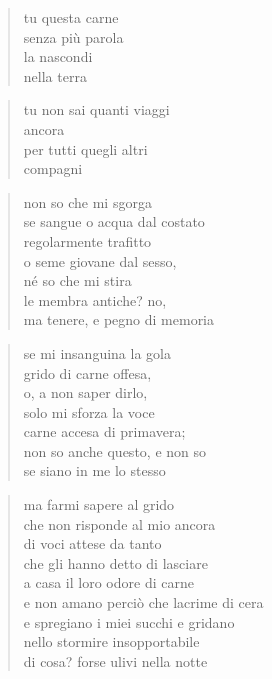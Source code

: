 	\begin{verse}
		tu questa carne\\
		senza più parola\\
		la nascondi\\
		nella terra
	\end{verse}

	\begin{verse}
		tu non sai quanti viaggi\\
		ancora\\
		per tutti quegli altri\\
		compagni
	\end{verse}

\clearpage


	\begin{verse}
		non so che mi sgorga\\
		se sangue o acqua dal costato\\
		regolarmente trafitto\\
		o seme giovane dal sesso,\\
		né so che mi stira\\
		le membra antiche? no,\\
		ma tenere, e pegno di memoria
	\end{verse}

	\begin{verse}
		se mi insanguina la gola\\
		grido di carne offesa,\\
		o, a non saper dirlo,\\
		solo mi sforza la voce\\
		carne accesa di primavera;\\
		non so anche questo, e non so\\
		se siano in me lo stesso
	\end{verse}

\clearpage


	\begin{verse}
		ma farmi sapere al grido\\
		che non risponde al mio ancora\\
		di voci attese da tanto\\
		che gli hanno detto di lasciare\\
		a casa il loro odore di carne\\
		e non amano perciò che lacrime di cera\\
		e spregiano i miei succhi e gridano\\
		nello stormire insopportabile\\
		di cosa? forse ulivi nella notte
	\end{verse}

